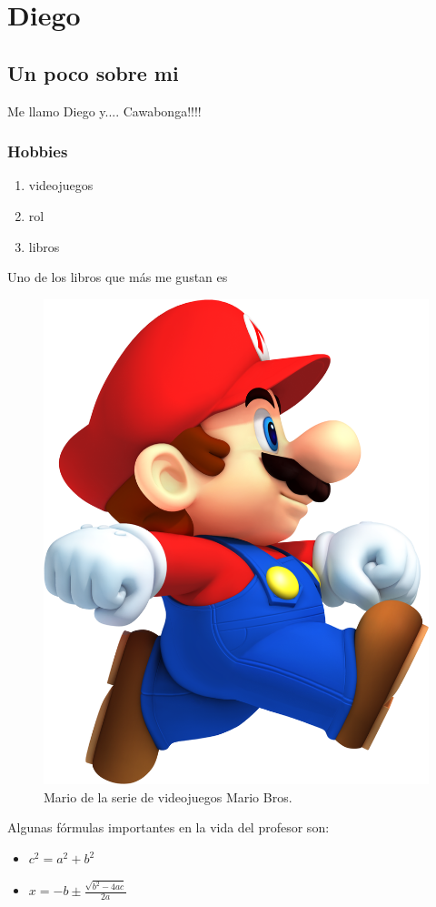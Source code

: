 \chapter{Diego}
\section{Un poco sobre mi}
Me llamo Diego y.... Cawabonga!!!!
\subsection{Hobbies}
\begin{enumerate}
\item videojuegos
\item rol
\item libros
\end{enumerate}

Uno de los libros que más me gustan es~\cite{torres}

\begin{figure}[h]
  \centering
  \includegraphics[scale=0.3]{IMG/31.png}
  \caption{Mario de la serie de videojuegos Mario Bros.}
\end{figure}
  
Algunas fórmulas importantes en la vida del profesor son:
\begin{itemize}
\item $c^2 = a^2 + b^2$
\item $x= -b \pm \frac{\sqrt{b^2-4ac}}{2a}$
\end{itemize}

